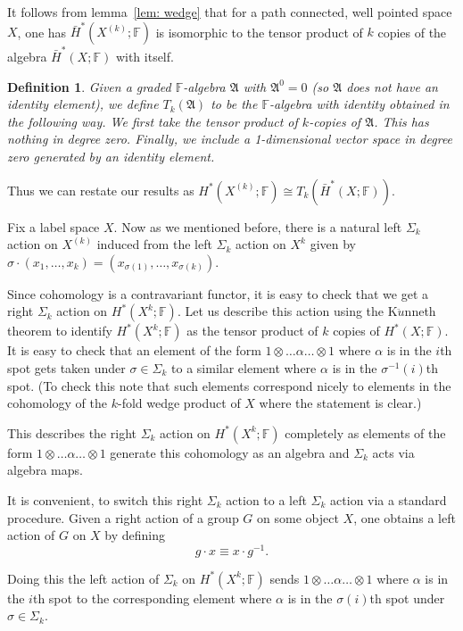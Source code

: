 \documentclass{amsart}
\newtheorem{defn}[thm]{Definition}
\newcommand{\FF}{\mathbb{F}}
\begin{document}
It follows from lemma~\ref{lem: wedge} that for a path connected, well pointed 
space $X$, one has $\bar{H}^*(X^{(k)};\FF)$ is isomorphic to 
the tensor product of $k$ copies of the algebra $\bar{H}^*(X;\FF)$ with 
itself. 

\begin{defn}
Given a graded $\FF$-algebra $\mathfrak{A}$ with $\mathfrak{A}^0=0$ 
(so $\mathfrak{A}$ does not have an identity element), we define 
$T_k(\mathfrak{A})$ to be the $\FF$-algebra with identity obtained in 
the following way. We first take the tensor product of $k$-copies of 
$\mathfrak{A}$. This has nothing in degree zero. Finally, we include 
a 1-dimensional vector space in degree zero generated by an identity element.
\end{defn}

Thus we can restate our results as 
$H^*(X^{(k)}; \FF) \cong T_k(\bar{H}^*(X; \FF))$.

Fix a label space $X$. 
Now as we mentioned before, there is a natural left $\Sigma_k$ action on 
$X^{(k)}$ induced from the left $\Sigma_k$ action on $X^k$ given by 
$\sigma \cdot (x_1, \dots, x_k)=(x_{\sigma(1)}, \dots, x_{\sigma(k)})$.

Since cohomology is a contravariant functor, it is easy to check that we 
get a right $\Sigma_k$ action on $H^*(X^k; \FF)$. Let us describe this 
action using the K$\ddot{u}$nneth theorem to identify 
$H^*(X^k; \FF)$ as the tensor product of $k$ copies of $H^*(X; \FF)$.
It is easy to check that an element of the form $1 \otimes \dots \alpha 
\dots \otimes 1$ where $\alpha$ is in the $i$th spot gets taken 
under $\sigma \in \Sigma_k$  
to a similar element where $\alpha$ is in the $\sigma^{-1}(i)$th spot.
(To check this note that such elements correspond nicely to elements 
in the cohomology of the $k$-fold wedge product of $X$ where the statement 
is clear.)

This describes the right $\Sigma_k$ action on $H^*(X^k; \FF)$ completely 
as elements of the form $1 \otimes \dots \alpha \dots \otimes 1$ 
generate this cohomology as an algebra and $\Sigma_k$ acts via 
algebra maps. 

It is convenient, to switch this right $\Sigma_k$ action to a left 
$\Sigma_k$ action via a standard procedure. Given a right action of 
a group $G$ on some object $X$, one obtains a left action of $G$ on $X$ 
by defining
$$ g \cdot x \equiv x \cdot g^{-1} .$$ 

Doing this the left action of $\Sigma_k$ on $H^*(X^k; \FF)$ sends  
$1 \otimes \dots \alpha \dots \otimes 1$ where $\alpha$ is in the $i$th 
spot to the corresponding element where $\alpha$ is in the 
$\sigma(i)$th spot under $\sigma \in \Sigma_k$.
\end{document}
